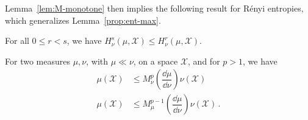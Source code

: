\documentclass[reqno]{amsart}
\begin{document}
Lemma~\ref{lem:M-monotone} then implies the following result for Rényi entropies, which generalizes Lemma~\ref{prop:ent-max}.
\begin{cor}
For all $0 \leq r < s$, we have $H^s_\nu(\mu,\mathcal{X}) \leq H^r_\nu(\mu,\mathcal{X})$.
\end{cor}






\begin{lem}
\label{lem:M}
For two measures $\mu, \nu$, with  $\mu \ll \nu$, on a space $\mathcal{X}$, and for $p > 1$, we have
\begin{align}
\mu(\mathcal{X}) &\leq M^p_\nu \left( \dfrac{\dd \mu}{\dd \nu}  \right) \nu(\mathcal{X}) \\
\label{eq:exp-renyi-ineq}
\mu(\mathcal{X}) &\leq  M^{p-1}_\mu \left( \dfrac{\dd \mu}{\dd \nu}  \right) \nu(\mathcal{X}) \, .
\end{align}
\end{lem}
\end{document}
